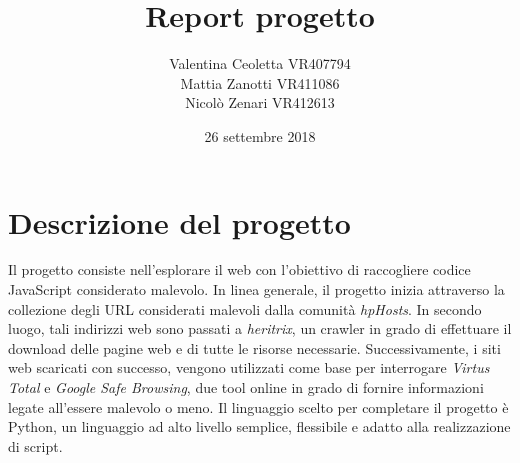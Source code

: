\documentclass[a4paper, 11pt, oneside]{report}
\title{Report progetto}
\author{Valentina Ceoletta VR407794\\Mattia Zanotti VR411086\\Nicol\`o Zenari VR412613}
\date{26 settembre 2018}
\begin{document}
\maketitle
\tableofcontents

\chapter{Descrizione del progetto}
Il progetto consiste nell'esplorare il web con l'obiettivo di raccogliere codice JavaScript considerato malevolo. In linea generale, il progetto inizia attraverso la collezione degli URL considerati malevoli dalla comunità \textit{hpHosts}. In secondo luogo, tali indirizzi web sono passati a \textit{heritrix}, un crawler in grado di effettuare il download delle pagine web e di tutte le risorse necessarie. Successivamente, i siti web scaricati con successo, vengono utilizzati come base per interrogare \textit{Virtus Total} e \textit{Google Safe Browsing}, due tool online in grado di fornire informazioni legate all'essere malevolo o meno. Il linguaggio scelto per completare il progetto è Python, un linguaggio ad alto livello semplice, flessibile e adatto alla realizzazione di script.
 
\end{document}
